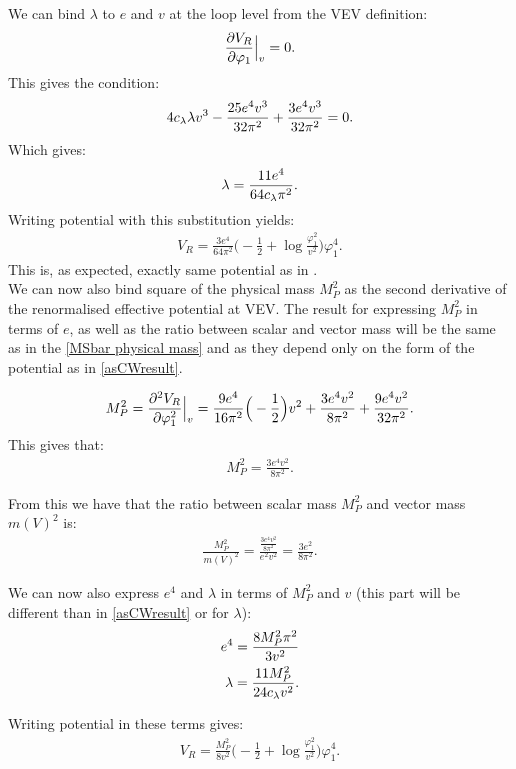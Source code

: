 We can bind $\lambda$ to $e$ and $v$ at the loop level from the VEV definition:
\begin{align}
\frac{\partial V_R}{\partial \varphi_1} \Big|_v= 0.
\end{align}
This gives the condition:
\begin{align}
4c_\lambda\lambda v^3-\frac{25e^4v^3}{32\pi^2}+\frac{3e^4v^3}{32\pi^2}=0.
\end{align}
Which gives:
\begin{align}\label{e4_lambda_MS}
\lambda = \frac{11e^4}{64c_\lambda\pi^2}.
\end{align}
Writing potential with this substitution yields:
\begin{align}\label{asCWresult}
V_R = \frac{3e^4}{64\pi^2}\Big(-\frac{1}{2}+\log\frac{\varphi_1^2}{v^2}\Big)\varphi_1^4.
\end{align}
This is, as expected, exactly same potential as in \citeColWein. \\

We can now also bind square of the physical mass $M_P^2$ as the second derivative of the 
renormalised effective potential at VEV. The result for expressing $M_P^2$ in terms 
of $e$, as well as the ratio between scalar and vector mass will be the same as in the 
\ref{MSbar physical mass} and \citeColWein as they depend only on the form 
of the potential as in \ref{asCWresult}. 

\begin{align}
M_P^2 = \frac{\partial^2 V_R}{\partial \varphi_1^2} \Big|_v = \frac{9e^4}{16\pi^2}\Big(-\frac{1}{2}\Big)v^2+\frac{3e^4v^2}{8\pi^2} 
+\frac{9e^4v^2}{32\pi^2}.
\end{align}
This gives that:
\begin{align}
M_P^2 = \frac{3e^4v^2}{8\pi^2}.
\end{align}

From this we have that the ratio between scalar mass $M_P^2$ and vector mass $m(V)^2$ is:
\begin{align}
\frac{M_P^2}{m(V)^2} = \frac{\frac{3e^4v^2}{8\pi^2}}{e^2v^2} = \frac{3e^2}{8\pi^2}.
\end{align}

We can now also express $e^4$ and $\lambda$ in terms of $M_P^2$ and $v$ (this part will 
be different than in \ref{asCWresult} or \citeColWein for $\lambda$):
\begin{align}
e^4 = \frac{8M_P^2\pi^2}{3v^2} \\
\lambda = \frac{11M_P^2}{24c_\lambda v^2}.
\end{align}

Writing potential in these terms gives:
\begin{align}
V_R = \frac{M_P^2}{8v^2}\Big(-\frac{1}{2}+\log\frac{\varphi_1^2}{v^2}\Big)\varphi_1^4.
\end{align}
